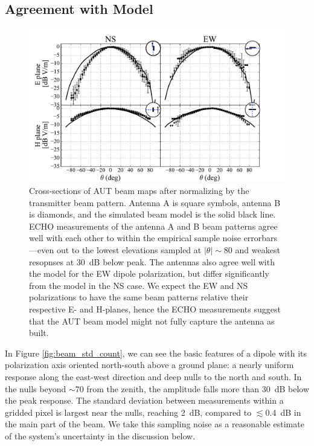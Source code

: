 \documentclass[preprint2,numberedappendix,tighten,twocolappendix]{aastex6}
\begin{document}
\subsection{Agreement with Model}

\begin{figure}
\includegraphics[width=\columnwidth]{figures/GB_slices_quad.pdf}
\caption{Cross-sections of AUT beam maps after normalizing by the transmitter beam pattern.  Antenna A is square symbols, antenna B is diamonds, and the simulated beam model is the solid black line.  ECHO measurements of the antenna A and B beam patterns agree well with each other to within the empirical sample noise errorbars---even out to the lowest elevations sampled at $|\theta|\sim80$\arcdeg{} and weakest resopnses at 30~dB below peak.  The antennas also agree well with the model for the EW dipole polarization, but differ significantly from the model in the NS case.  We expect the EW and NS polarizations to have the same beam patterns relative their respective E- and H-planes, hence the ECHO measurements suggest that the AUT beam model might not fully capture the antenna as built.   \label{fig:GB_slices_quad}}
\end{figure}

In Figure \ref{fig:beam_std_count}, we can see the basic features of a dipole with its polarization axis oriented north-south above a ground plane: a nearly uniform response along the east-west direction and deep nulls to the north and south.  In the nulls beyond $\sim$70\arcdeg{} from the zenith, the amplitude falls more than 30~dB below the peak response.  The standard deviation between measurements within a gridded pixel is largest near the nulls, reaching 2~dB, compared to $\lesssim$0.4~dB in the main part of the beam.  We take this sampling noise as a reasonable estimate of the system's uncertainty in the discussion below.  
\end{document}
